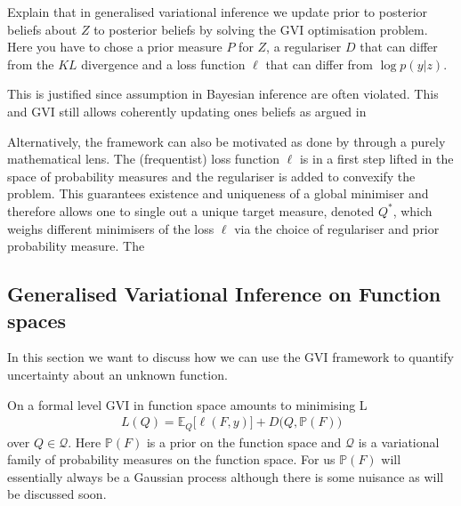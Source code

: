 \documentclass{article}
\newcommand{\bbP}{\mathbb{P}}
\newcommand{\bbE}{\mathbb{E}}
\newcommand{\calQ}{\mathcal{Q}}
\numberwithin{equation}{section}
\begin{document}
Explain that in generalised variational inference we update prior to posterior beliefs about $Z$ to posterior beliefs  by solving the GVI optimisation problem. Here you have to chose a prior measure $P$ for $Z$, a regulariser $D$ that can differ from the $KL$ divergence and a loss function $\ell$ that can differ from $\log p(y|z)$.

This is justified since assumption in Bayesian inference are often violated. This and GVI still allows coherently updating ones beliefs as argued in \citet{knoblauch2022optimization}

Alternatively, the framework can also be motivated as done by \citet{wild2023rigorous} through a purely mathematical lens. The (frequentist) loss function $\ell$ is in a first step lifted in the space of probability measures and the regulariser is added to convexify the problem. This guarantees existence and uniqueness of a global minimiser and therefore allows one to single out a unique target measure, denoted $Q^*$, which weighs different minimisers of the loss $\ell$ via the choice of regulariser and prior probability measure. The

\subsection{Generalised Variational Inference on Function spaces}
In this section we want to discuss how we can use the GVI framework to quantify uncertainty about an unknown function.

On a formal level GVI in function space amounts to minimising  L
\begin{align}
    L(Q) = \bbE_Q  \big[ \ell(F,y) \big] + D \big(Q, \bbP(F) \big)
\end{align}
over $Q \in \calQ$. Here $\bbP(F)$ is a prior on the function space and $\calQ$ is a variational family of probability measures on the function space. For us $\bbP(F)$ will essentially always be a Gaussian process although there is some nuisance as will be discussed soon.
\end{document}
